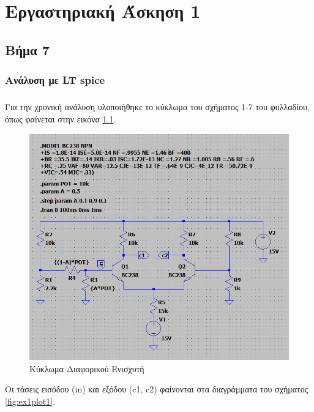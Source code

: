 \documentclass[11pt,a4paper,twoside,onecolumn,openright,final]{memoir}
\begin{document}
\mainmatter


\chapter{Εργαστηριακή Άσκηση 1}

\section{Βήμα 7}

\subsection{Ανάλυση με LT spice}

\paragraph*{} Για την χρονική ανάλυση υλοποιήθηκε το κύκλωμα του σχήματος 1-7 του φυλλαδίου, όπως φαίνεται στην εικόνα \ref{fig:ex1circuit1}.

\begin{figure}[h]
\centerfloat%
\includegraphics[width=12.0cm]{figures/exercise1circuit1.png}
\caption{Κύκλωμα Διαφορικού Ενισχυτή}\label{fig:ex1circuit1}
\end{figure}

Οι τάσεις εισόδου (in) και εξόδου (c1, c2) φαίνονται στα διαγράμματα του σχήματος \ref{fig:ex1plot1}.
\end{document}
